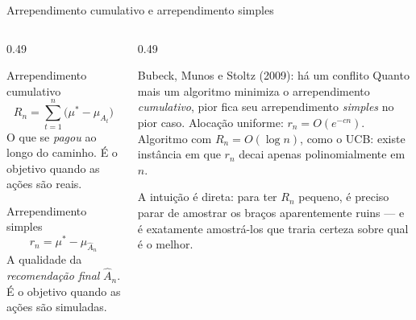 \documentclass[aspectratio=169, 10pt]{beamer}
\begin{document}
\begin{frame}{Arrependimento cumulativo e arrependimento simples}
  \small
  \begin{columns}[T]
    \begin{column}{0.49\textwidth}
      \begin{defbox}{Arrependimento cumulativo}
        \[ R_n = \sum_{t=1}^{n}\bigl(\mu^{*} - \mu_{A_t}\bigr) \]
        O que se \emph{pagou} ao longo do caminho. É o objetivo quando as ações
        são reais.
      \end{defbox}
      \begin{defbox}{Arrependimento simples}
        \[ r_n = \mu^{*} - \mu_{\widehat{A}_n} \]
        A qualidade da \emph{recomendação final} $\widehat{A}_n$. É o objetivo
        quando as ações são simuladas.
      \end{defbox}
    \end{column}
    \begin{column}{0.49\textwidth}
      \begin{teobox}{Bubeck, Munos e Stoltz (2009): há um conflito}
        Quanto mais um algoritmo minimiza o arrependimento \emph{cumulativo}, pior
        fica seu arrependimento \emph{simples} no pior caso.
        \smallskip
        Alocação uniforme: $r_n = O(e^{-cn})$.\\
        Algoritmo com $R_n = O(\log n)$, como o UCB: existe instância em que
        $r_n$ decai apenas \alert{polinomialmente} em $n$.
      \end{teobox}
      \begin{ideiabox}
        A intuição é direta: para ter $R_n$ pequeno, é preciso parar de amostrar
        os braços aparentemente ruins --- e é exatamente amostrá-los que traria
        certeza sobre qual é o melhor.
      \end{ideiabox}
    \end{column}
  \end{columns}
\end{frame}
\end{document}
